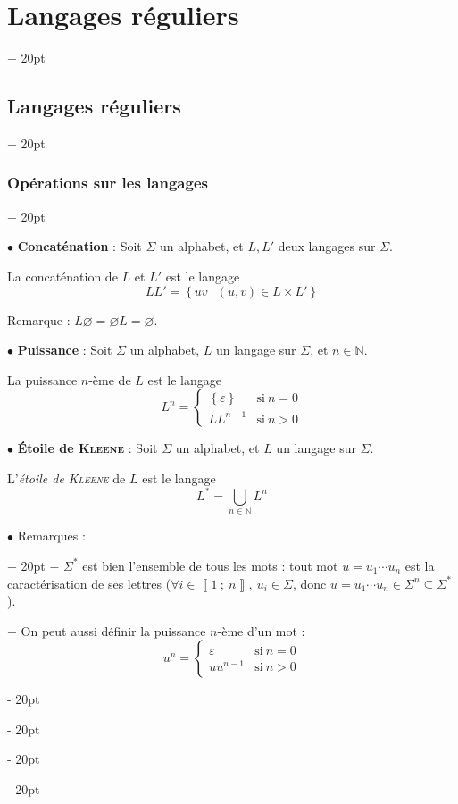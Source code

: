 \documentclass[a4paper, 12pt, twoside]{article}
\newcommand{\N}{\mathbb{N}} %
\newcommand{\nset}[2]{\left\llbracket #1\ ;\ #2 \right\rrbracket}
\newcommand{\set}[1]{\left\{ #1 \right\}}
\newcommand{\ind}[1][20pt]{\advance\leftskip + #1}
\newcommand{\deind}[1][20pt]{\advance\leftskip - #1}
\newenvironment{indt}[2][20pt]{#2 \par \ind[#1]}{\par \deind} %
\begin{document}
\begin{indt}{\section{Langages réguliers}}
\begin{indt}{\subsection{Langages réguliers}}
\begin{indt}{\subsubsection{Opérations sur les langages}}
                \vspace{12pt}
                
                $\bullet$ \textbf{Concaténation} : Soit $\Sigma$ un alphabet, et $L, L'$ deux langages sur $\Sigma$.

                La concaténation de $L$ et $L'$ est le langage
                \[
                    LL' = \set{uv\ |\ (u, v) \in L \times L'}
                \]

                Remarque : $L \varnothing = \varnothing L = \varnothing$.

                \vspace{12pt}
                
                $\bullet$ \textbf{Puissance} : Soit $\Sigma$ un alphabet, $L$ un langage sur $\Sigma$, et $n \in \N$.

                La puissance $n$-ème de $L$ est le langage
                \[
                    L^n =
                    \begin{cases}
                        \set \varepsilon
                        & \text{si}\ n = 0
                        \\
                        LL^{n - 1}
                        & \text{si}\ n > 0
                    \end{cases}
                \]

                \vspace{12pt}
                
                $\bullet$ \textbf{\'Etoile de \textsc{Kleene}} : Soit $\Sigma$ un alphabet, et $L$ un langage sur $\Sigma$.

                L'\emph{étoile de \textsc{Kleene}} de $L$ est le langage
                \[
                    L^* = \bigcup_{n \in \N} L^n
                \]

                \vspace{12pt}
                
                \begin{indt}{$\bullet$ Remarques :}
                    $-$ $\Sigma^*$ est bien l'ensemble de tous les mots : tout mot $u = u_1 \cdots u_n$ est la caractérisation de ses lettres ($\forall i \in \nset{1}{n},\ u_i \in \Sigma$, donc $u = u_1 \cdots u_n \in \Sigma^n \subseteq \Sigma^*$).

                    $-$ On peut aussi définir la puissance $n$-ème d'un mot :
                    \[
                        u^n =
                        \begin{cases}
                            \varepsilon
                            & \text{si}\ n = 0
                            \\
                            u u^{n - 1}
                            & \text{si}\ n > 0
                        \end{cases}
                    \]


\end{indt}
\end{indt}
\end{indt}
\end{indt}
\end{document}
